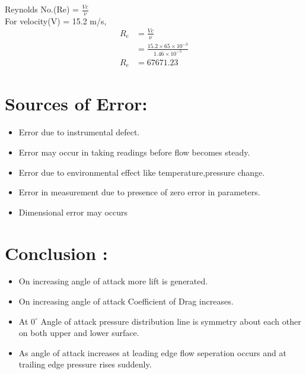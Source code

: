 \documentclass[12pt,a4paper]{article}
\begin{document}
Reynolds No.(Re) = $\frac{Vc}{\nu}$ \\



For velocity(V) = 15.2 m/s, \\
\begin{align*}
    R_e &= \frac{Vc}{\nu} \\
    &= \frac{15.2\times65\times 10^{-3}}{1.46\times 10^{-5}}\\
    R_e &= 67671.23 
\end{align*}





\section{Sources of Error:}
\begin{itemize}
    \item Error due to instrumental defect.
    \item Error may occur in taking readings before flow becomes steady.
    \item Error due to environmental effect like temperature,pressure change.
    \item Error in measurement due to presence of zero error in parameters.
    \item Dimensional error may occurs 
\end{itemize}



\section{Conclusion :}
\begin{itemize}
    \item On increasing angle of attack more lift is generated.
    \item On increasing angle of attack Coefficient of Drag increases.  
    \item At $0^{\circ}$ Angle of attack pressure distribution line is symmetry about each other on both upper and lower surface.
    \item As angle of attack increases at leading edge flow seperation occurs and at trailing edge pressure rises suddenly.
\end{itemize}
\end{document}
